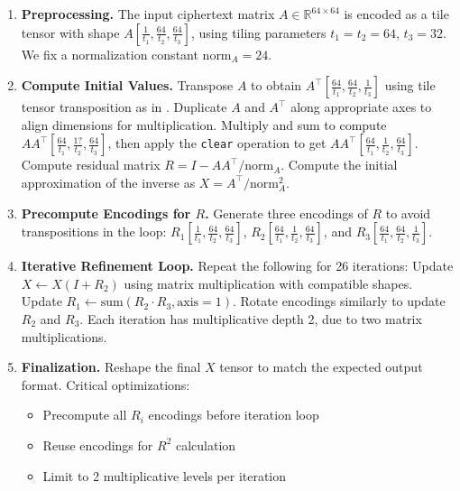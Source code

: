 \documentclass[article]{iacrtrans}
\begin{document}
\begin{enumerate}
    \item \textbf{Preprocessing.}  
    The input ciphertext matrix \( A \in \mathbb{R}^{64 \times 64} \) is encoded as a tile tensor with shape \( A[\frac{1}{t_1}, \frac{64}{t_2}, \frac{64}{t_3}] \), using tiling parameters \( t_1 = t_2 = 64 \), \( t_3 = 32 \). We fix a normalization constant \( \text{norm}_A = 24 \).

    \item \textbf{Compute Initial Values.}  
    Transpose \( A \) to obtain \( A^\top[\frac{64}{t_1}, \frac{64}{t_2}, \frac{1}{t_3}] \) using tile tensor transposition as in \cite{Aharoni2023}.  
    Duplicate \( A \) and \( A^\top \) along appropriate axes to align dimensions for multiplication.  
    Multiply and sum to compute \( AA^\top[\frac{64}{t_1}, \frac{1?}{t_2}, \frac{64}{t_3}] \), then apply the \texttt{clear} operation to get \( AA^\top[\frac{64}{t_1}, \frac{1}{t_2}, \frac{64}{t_3}] \).  
    Compute residual matrix \( R = I - AA^\top / \text{norm}_A \).  
    Compute the initial approximation of the inverse as \( X = A^\top / \text{norm}_A^2 \).

    \item \textbf{Precompute Encodings for \( R \).}  
    Generate three encodings of \( R \) to avoid transpositions in the loop:  
    \( R_1[\frac{1}{t_1}, \frac{64}{t_2}, \frac{64}{t_3}] \),  
    \( R_2[\frac{64}{t_1}, \frac{1}{t_2}, \frac{64}{t_3}] \), and  
    \( R_3[\frac{64}{t_1}, \frac{64}{t_2}, \frac{1}{t_3}] \).

    \item \textbf{Iterative Refinement Loop.}  
    Repeat the following for 26 iterations:  
    Update \( X \leftarrow X(I + R_2) \) using matrix multiplication with compatible shapes.  
    Update \( R_1 \leftarrow \text{sum}(R_2 \cdot R_3, \text{axis}=1) \).  
    Rotate encodings similarly to update \( R_2 \) and \( R_3 \).  
    Each iteration has multiplicative depth 2, due to two matrix multiplications.

\item \textbf{Finalization.}  
    Reshape the final \( X \) tensor to match the expected output format.  
      Critical optimizations:
      \begin{itemize}
        \item Precompute all $R_i$ encodings before iteration loop
        \item Reuse encodings for $R^2$ calculation
        \item Limit to 2 multiplicative levels per iteration
      \end{itemize}
\end{enumerate}
\end{document}
